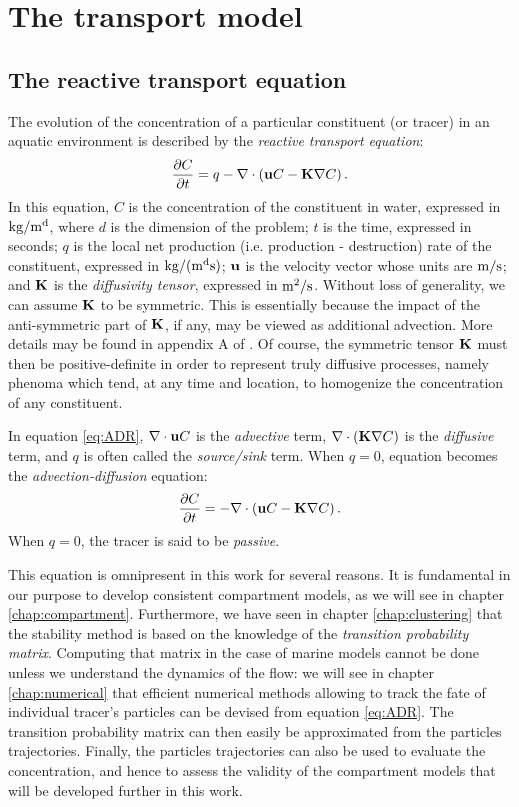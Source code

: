 \chapter{The transport model} \label{chap:transportmodel}
\section{The reactive transport equation}
The evolution of the concentration of a particular constituent (or tracer) in an aquatic environment is described by the \textit{reactive transport equation}:
\begin{equation}\label{eq:ADR}
	\frac{\partial C}{\partial t} = q-\nabla \cdot \left(\b uC - \b K \nabla C\right).
\end{equation}
In this equation, $C$ is the concentration of the constituent in water, expressed in $\rm{kg/m^d}$, where $d$ is the dimension of the problem; $t$ is the time, expressed in seconds; $q$ is the local net production (i.e. production - destruction) rate of the constituent, expressed in $\rm{kg/(m^ds)}$; $\b u$ is the velocity vector whose units are $\rm{m/s}$; and $\b K$ is the \textit{diffusivity tensor}, expressed in $\rm{m^2/s}$. Without loss of generality, we can assume $\b K$ to be symmetric. This is essentially because the impact of the anti-symmetric part of $\b K$, if any, may be viewed as additional advection. More details may be found in appendix A of \cite{deleersnijder2001concept}. Of course, the symmetric tensor $\b K$ must then be positive-definite in order to represent truly diffusive processes, namely phenoma which tend, at any time and location, to homogenize the concentration of any constituent.

In equation \eqref{eq:ADR}, $\nabla \cdot \b u C$ is the \textit{advective} term, $\nabla \cdot (\b K \nabla C)$ is the \textit{diffusive} term, and $q$ is often called the \textit{source/sink} term. When $q=0$, equation becomes the \textit{advection-diffusion} equation:
\begin{equation}\label{eq:C_PDE_vec}
 	\frac{\partial C}{\partial t} = -\nabla \cdot \left(\b uC - \b K \nabla C\right).
 \end{equation}
 When $q=0$, the tracer is said to be \textit{passive}.

This equation is omnipresent in this work for several reasons. It is fundamental in our purpose to develop consistent compartment models, as we will see in chapter \ref{chap:compartment}. Furthermore, we have seen in chapter \ref{chap:clustering} that the stability method is based on the knowledge of the \textit{transition probability matrix}. Computing that matrix in the case of marine models cannot be done unless we understand the dynamics of the flow: we will see in chapter \ref{chap:numerical} that efficient numerical methods allowing to track the fate of individual tracer's particles can be devised from equation \eqref{eq:ADR}. The transition probability matrix can then easily be approximated from the particles trajectories. Finally, the particles trajectories can also be used to evaluate the concentration, and hence to assess the validity of the compartment models that will be developed further in this work.

